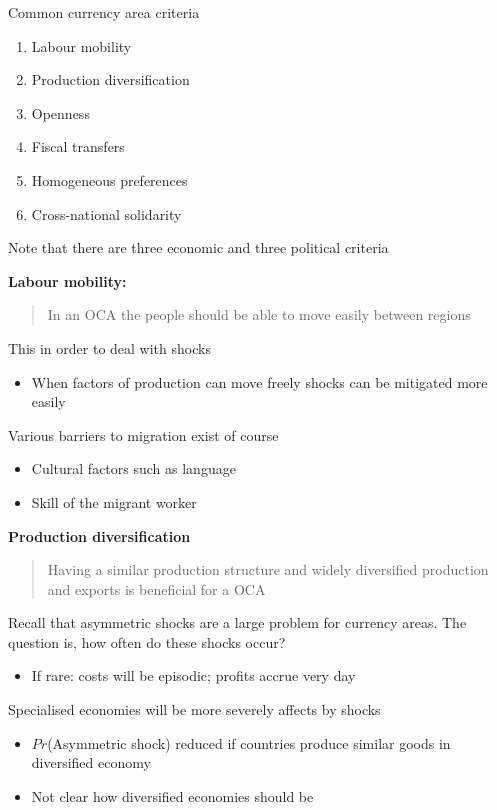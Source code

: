 \documentclass{beamer}
\begin{document}
\begin{frame}
  Common currency area criteria
  \begin{enumerate}
    \item Labour mobility
    \item Production diversification
    \item Openness
    \item Fiscal transfers
    \item Homogeneous preferences
    \item Cross-national solidarity
  \end{enumerate}
  \medskip
  Note that there are three economic and three political criteria
\end{frame}

\begin{frame}
  \textbf{Labour mobility:} 
  \begin{quote}
    In an OCA the people should be able to move easily between regions
  \end{quote}
  \medskip
  This in order to deal with shocks
  \begin{itemize}
    \item When factors of production can move freely shocks can be mitigated more easily
  \end{itemize}
  \medskip
  Various barriers to migration exist of course
  \begin{itemize}
    \item Cultural factors such as language
    \item Skill of the migrant worker
  \end{itemize}
\end{frame}

\begin{frame}
  \textbf{Production diversification}
  \begin{quote}
    Having a similar production structure and widely diversified production and exports is beneficial for a OCA
  \end{quote}
   Recall that asymmetric shocks are a large problem for currency areas. The question is, how often do these shocks occur?
  \begin{itemize}    
    \item If rare: costs will be episodic; profits accrue very day
  \end{itemize}
  \medskip
  Specialised economies will be more severely affects by shocks
  \begin{itemize}
    \item $Pr$(Asymmetric shock) reduced if countries produce similar goods in diversified economy
    \item Not clear how diversified economies should be
  \end{itemize}
\end{frame}
\end{document}
